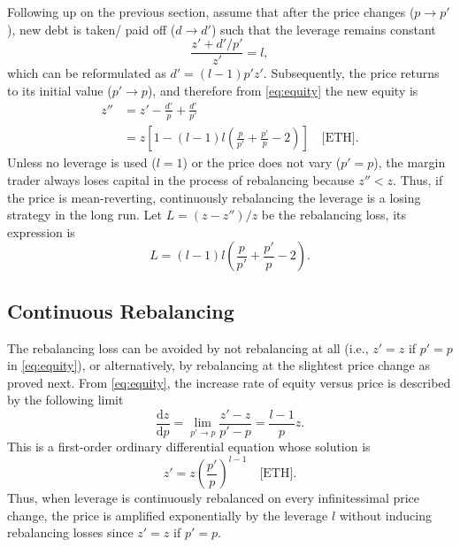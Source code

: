 \documentclass[journal,letterpaper,oneside,onecolumn,12pt]{IEEEtran}
\begin{document}
	Following up on the previous section, assume that after the price changes ($p\rightarrow p'$), new debt is taken/ paid off ($d\rightarrow d'$) such that the leverage remains constant
	\begin{equation}
		\frac{z'+d'/p'}{z'} = l,
	\end{equation}
	which can be reformulated as $d'=(l-1)p'z'$.
	Subsequently, the price returns to its initial value ($p'\rightarrow p$), and therefore from \eqref{eq:equity} the new equity is
	\begin{align} 
		z'' &= z' -\frac{d'}{p} +\frac{d'}{p'}  \\
		&= z\left[1-(l-1)l\left(\frac{p}{p'}+\frac{p'}{p}-2\right)\right] \quad\text{[ETH].} \label{eq:equity:fluctuation}
	\end{align}
	Unless no leverage is used ($l=1$) or the price does not vary ($p'=p$), the margin trader always loses capital in the process of rebalancing because $z''<z$. Thus, if the price is mean-reverting, continuously rebalancing the leverage is a losing strategy in the long run. Let $L = (z-z'')/z$ be the rebalancing loss, its expression is
	\begin{equation} \label{eq:rebalancing_loss}
		L = (l-1)l\left(\frac{p}{p'}+\frac{p'}{p}-2\right).
	\end{equation}
	
	
	\subsection{Continuous Rebalancing} \label{app:rebalancing}
	
	The rebalancing loss can be avoided by not rebalancing at all (i.e., $z'=z$ if $p'=p$ in \eqref{eq:equity}), or alternatively, by rebalancing at the slightest price change as proved next. From \eqref{eq:equity}, the increase rate of equity versus price is described by the following limit
	\begin{equation}
		\frac{\mathrm{d}z}{\mathrm{d}p} = \lim\limits_{p'\rightarrow p} \frac{z'-z}{p'-p} = \frac{l-1}{p}z.
	\end{equation}
	This is a first-order ordinary differential equation whose solution is
	\begin{equation}
		z' = z \left(\frac{p'}{p}\right)^{l-1} \quad\text{[ETH].}
	\end{equation}
	Thus, when leverage is continuously rebalanced on every infinitessimal price change, the price is amplified exponentially by the leverage $l$ without inducing rebalancing losses since $z'=z$ if $p'=p$.
	

	


	
	
%	
%	
	
	
\end{document}
